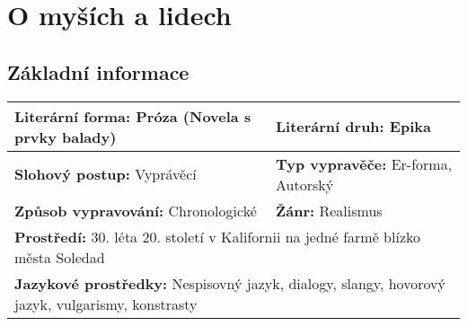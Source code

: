 \section{O myších a lidech}
\label{sec:omysichalidech}
\subsection*{Základní informace}
\begin{tabularx}{\linewidth}{l|l}
  \textbf{Literární forma:} Próza (Novela s prvky balady\footnotemark[1]) & \textbf{Literární druh:} Epika                    \\
  \hline
  \textbf{Slohový postup:} Vyprávěcí                                      & \textbf{Typ vypravěče:} Er-forma, Autorský        \\
  \hline
  \textbf{Způsob vypravování:} Chronologické                              & \textbf{Žánr:} Realismus                          \\
  \hline
  \multicolumn{2}{l}{\textbf{Prostředí:} 30. léta 20. století v Kalifornii na jedné farmě blízko města Soledad}               \\
  \hline
  \multicolumn{2}{l}{\textbf{Jazykové prostředky:} Nespisovný jazyk, dialogy, slangy, hovorový jazyk, vulgarismy, konstrasty} \\
\end{tabularx}
